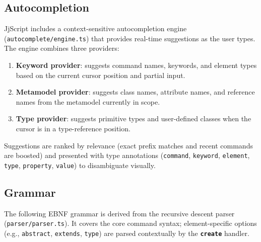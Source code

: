 \documentclass[11pt,a4paper]{article}
\newcommand{\jjscript}{\textsf{JjScript}}
\newcommand{\kw}[1]{\texttt{\textbf{#1}}}
\begin{document}
\subsection{Autocompletion}\label{sec:jjscript-autocomplete}

\jjscript{} includes a context-sensitive autocompletion engine
(\texttt{autocomplete/engine.ts}) that provides real-time suggestions
as the user types. The engine combines three providers:

\begin{enumerate}
    \item \textbf{Keyword provider}: suggests command names, keywords, and
          element types based on the current cursor position and partial
          input.
    \item \textbf{Metamodel provider}: suggests class names, attribute
          names, and reference names from the metamodel currently in scope.
    \item \textbf{Type provider}: suggests primitive types and user-defined
          classes when the cursor is in a type-reference position.
\end{enumerate}

Suggestions are ranked by relevance (exact prefix matches and recent
commands are boosted) and presented with type annotations
(\texttt{command}, \texttt{keyword}, \texttt{element}, \texttt{type},
\texttt{property}, \texttt{value}) to disambiguate visually.


\subsection{Grammar}\label{sec:jjscript-grammar}

The following EBNF grammar is derived from the recursive descent parser
(\texttt{parser/parser.ts}). It covers the core command syntax; element-specific
options (e.g., \texttt{abstract}, \texttt{extends}, \texttt{type}) are
parsed contextually by the \kw{create} handler.
\end{document}
